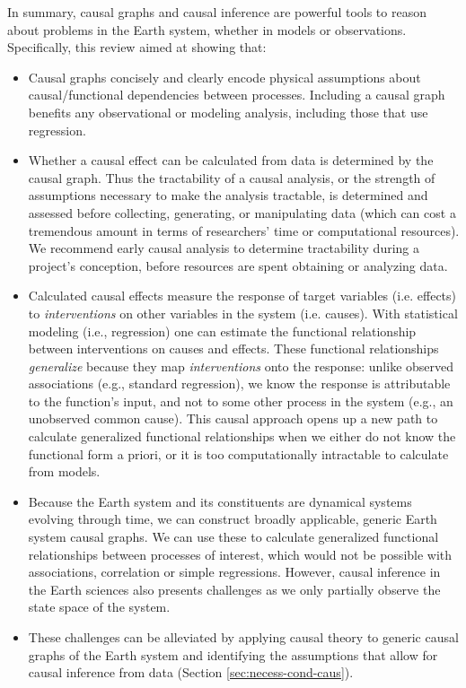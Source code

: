 \documentclass[12pt]{article}
\begin{document}
In summary, causal graphs and causal inference are powerful tools to
reason about problems in the Earth system, whether in models or observations. Specifically, this review
aimed at showing that:

\begin{itemize}
\item Causal graphs concisely and clearly encode physical assumptions about
  causal/functional dependencies between processes. Including a causal
  graph benefits any observational or modeling analysis, including
  those that use regression.
\item Whether a causal effect can be calculated from data is
  determined by the causal graph. Thus the tractability of a causal
  analysis, or the strength of assumptions necessary to make the
  analysis tractable, is determined and assessed before collecting,
  generating, or manipulating data (which can cost a tremendous amount
  in terms of researchers' time or computational resources). We
  recommend early causal analysis to determine tractability during a
  project's conception, before resources are spent obtaining or
  analyzing data.
\item Calculated causal effects measure the response of target
  variables (i.e. effects) to \textit{interventions} on other
  variables in the system (i.e. causes). With statistical modeling
  (i.e., regression) one can estimate the functional relationship
  between interventions on causes and effects.  These functional
  relationships \textit{generalize} because they map
  \textit{interventions} onto the response: unlike observed
  associations (e.g., standard regression), we know the response is
  attributable to the function's input, and not to some other process in
  the system (e.g., an unobserved common cause). This causal approach opens
  up a new path to calculate generalized functional relationships when
  we either do not know the functional form a priori, or it is too
  computationally intractable to calculate from models.
\item Because the Earth system and its constituents are dynamical
  systems evolving through time, we can construct broadly applicable,
  generic Earth system causal graphs. We can use these to calculate
  generalized functional relationships between processes of interest,
  which would not be possible with associations, correlation or simple
  regressions. However, causal inference in the Earth sciences also presents
  challenges as we only partially observe the state space of the system.
\item These challenges can be alleviated by applying causal theory to
  generic causal graphs of the Earth system and identifying the
  assumptions that allow for causal inference from data (Section
  \ref{sec:necess-cond-caus}).
\end{itemize}
\end{document}
